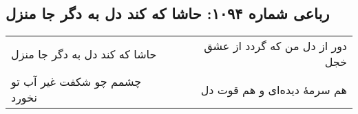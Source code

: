\begin{center}
\section*{رباعی شماره ۱۰۹۴: حاشا که کند دل به دگر جا منزل}
\label{sec:1094}
\begin{longtable}{l p{0.5cm} r}
حاشا که کند دل به دگر جا منزل
&&
دور از دل من که گردد از عشق خجل
\\
چشمم چو شکفت غیر آب تو نخورد
&&
هم سرمهٔ دیده‌ای و هم قوت دل
\\
\end{longtable}
\end{center}
